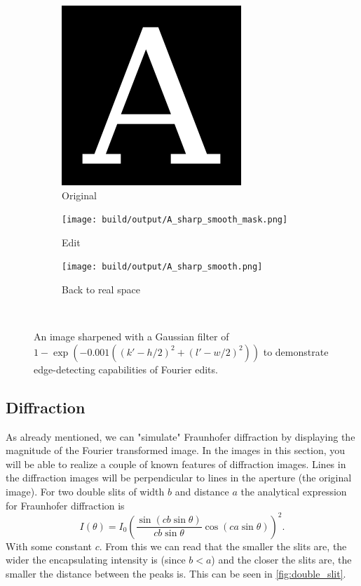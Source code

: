 \begin{figure}[htbp]
    \centering
    \begin{subfigure}[h]{.32\linewidth}
        \centering
        \includegraphics[width=.9\linewidth]{images/A.png}
        \caption{Original }
    \end{subfigure}
    \begin{subfigure}[h]{.32\linewidth}
        \centering
        \texttt{[image: build/output/A\_sharp\_smooth\_mask.png]}
        \caption{Edit}
    \end{subfigure}
    \begin{subfigure}[h]{.32\linewidth}
        \centering
        \texttt{[image: build/output/A\_sharp\_smooth.png]}
        \caption{Back to real space}
    \end{subfigure}\
    \caption{An image sharpened with a Gaussian filter of $1-\exp(-0.001 ((k'-h/2)^2+(l'-w/2)^2))$ to demonstrate edge-detecting capabilities of Fourier edits.}
    \label{fig:edges}
\end{figure}

\subsection{Diffraction}
As already mentioned, we can
"simulate" Fraunhofer diffraction by displaying the magnitude of the Fourier transformed image.
In the images in this section, you will be able to realize a couple of known features
of diffraction images.
Lines in the diffraction images will be perpendicular to lines in the aperture (the original image).
For two double slits of width $b$ and distance $a$ the analytical expression for Fraunhofer diffraction
is
\begin{equation}
    I(\theta) = I_0 \left(\frac{\sin(c b \sin\theta)}{c b \sin\theta} \cos(c a \sin\theta)\right)^2.
\end{equation}
With some constant $c$. From this we can read that the smaller the slits are, the wider the
encapsulating intensity is (since $b < a$) and the closer the slits are, the smaller the distance between
the peaks is. This can be seen in \autoref{fig:double_slit}.

